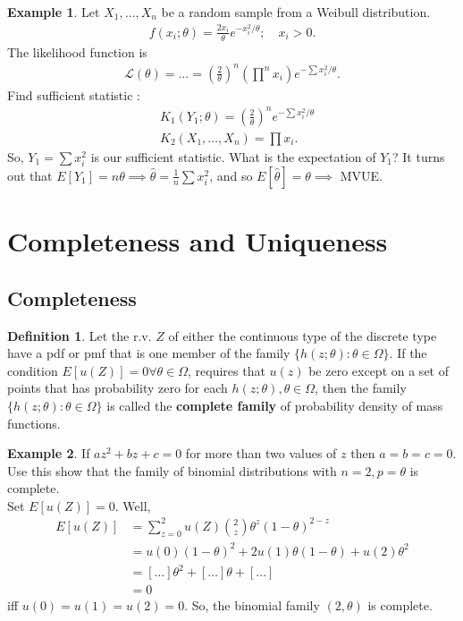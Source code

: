\documentclass{book}
\theoremstyle{definition}
\newtheorem{defn}{Definition}[section]
\newtheorem{exmp}{Example}[section]
\newcommand{\lag}{\mathcal{L}}
\newcommand{\nn}{\nonumber}
\newcommand{\f}[2]{\frac{#1}{#2}}
\newcommand{\lp}{\left(}
\newcommand{\rp}{\right)}
\begin{document}
\begin{exmp}
	Let $X_1,\dots,X_n$ be a random sample from a Weibull distribution. 
	\begin{align}
	f(x_i;\theta) = \f{2x_i}{\theta}e^{-x_i^2/\theta}; \quad x_i > 0.
	\end{align}
	The likelihood function is 
	\begin{align}
	\lag(\theta) = \dots = \lp \f{2}{\theta} \rp^n \lp \prod^n x_i \rp e^{-\sum x_i^2/\theta}.
	\end{align}
	Find sufficient statistic :
	\begin{align}
	&K_1(Y_1;\theta) = \lp \f{2}{\theta} \rp^n  e^{-\sum x_i^2/\theta}\nn\\
	&K_2(X_1,\dots,X_n) = \prod x_i.
	\end{align}
	So, $Y_1 = \sum x_i^2$ is our sufficient statistic. What is the expectation of $Y_1$? It turns out that $E[Y_1] = n\theta \implies \hat\theta = \f{1}{n}\sum x_i^2$, and so $E[\hat\theta] = \theta \implies $ MVUE. 
\end{exmp}




\section{Completeness and Uniqueness}



\subsection{Completeness}

\begin{defn}
	Let the r.v. $Z$ of either the continuous type of the discrete type have a pdf or pmf that is one member of the family $\{  h(z;\theta) : \theta \in \Omega \}$. If the condition $E[u(Z)] = 0 \forall \theta \in \Omega$, requires that $u(z)$ be zero except on a set of points that has probability zero for each $h(z;\theta), \theta \in \Omega$, then the family $\{ h(z;\theta): \theta \in \Omega \}$ is called the \textbf{complete family} of probability density of mass functions.
\end{defn}



\begin{exmp}
	If $az^2 + bz + c = 0$ for more than two values of $z$ then $a=b=c=0$. Use this show that the family of binomial distributions with $n=2, p=\theta$ is complete. \\
	
	
	Set $E[u(Z)] = 0$. Well, 
	\begin{align*}
	E[u(Z)] &= \sum^2_{z=0}u(Z){{2}\choose{z}} \theta^z (1-\theta)^{2-z}\nn\\
	&= u(0)(1-\theta)^2 + 2u(1)\theta(1-\theta)  	+ u(2)\theta^2\nn\\
	&= [\dots]\theta^2 + [\dots]\theta + [\dots]\nn\\
	&= 0
	\end{align*}
	iff $u(0) = u(1) = u(2) = 0$. So, the binomial family $(2,\theta)$ is complete. 
\end{exmp}
\end{document}
